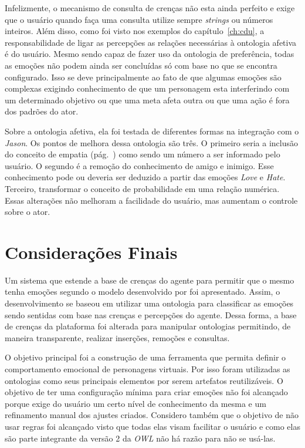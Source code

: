 Infelizmente, o mecanismo de consulta de crenças não esta ainda perfeito e
exige que o usuário quando faça uma consulta utilize sempre \emph{strings} ou
números inteiros. Além disso, como foi visto nos exemplos do
capítulo~\ref{ch:cdu}, a responsabilidade de ligar as percepções as relações
necessárias à ontologia afetiva é do usuário. Mesmo sendo capaz de fazer uso
da ontologia de preferência, todas as emoções não podem ainda ser concluídas
só com base no que se encontra configurado. Isso se deve principalmente ao
fato de que algumas emoções são complexas exigindo conhecimento de que um
personagem esta interferindo com um determinado objetivo ou que uma meta afeta
outra ou que uma ação é fora dos padrões do ator.

Sobre a ontologia afetiva, ela foi testada de diferentes formas na integração
com o \emph{Jason}.
Os pontos de melhora dessa
ontologia são três. O primeiro seria a inclusão do conceito de empatia
(pág.~\pageref{mark:empat}) como sendo um número a ser informado pelo usuário.
O segundo é a remoção do conhecimento de amigo e inimigo. Esse conhecimento
pode ou deveria ser deduzido a partir das emoções \emph{Love} e \emph{Hate}.
Terceiro, transformar o conceito de probabilidade em uma relação numérica.
Essas alterações não melhoram a facilidade do usuário, mas aumentam o controle
sobre o ator.

\section{Considerações Finais}

Um sistema que estende a base de crenças do agente \jason para permitir que o
mesmo tenha emoções segundo o modelo desenvolvido por \citet{ortony1988cse}
foi apresentado. Assim, o desenvolvimento se baseou em utilizar uma ontologia
para classificar as emoções sendo sentidas com base nas crenças e
percepções do agente.
Dessa forma, a base de crenças da plataforma foi alterada para manipular
ontologias permitindo, de maneira transparente, realizar inserções, remoções e
consultas.

O objetivo principal foi a construção de uma ferramenta que permita definir o
comportamento emocional de personagens virtuais. Por isso foram utilizadas as ontologias
como seus principais elementos por serem artefatos reutilizáveis. O objetivo
de ter uma configuração mínima para criar emoções não foi alcançado porque
exige do usuário um certo nível de conhecimento da mesma e um refinamento
manual dos ajustes criados. Considero também que o objetivo de não usar regras
foi alcançado visto que todas elas visam facilitar o usuário e como elas são
parte integrante da versão 2 da \emph{OWL} não há razão para não se usá-las.

